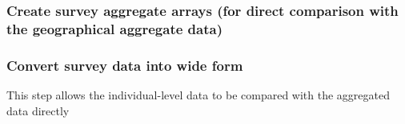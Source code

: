 \subsubsection{Create survey aggregate arrays (for direct comparison
with the geographical aggregate data)}

\begin{Shaded}
\begin{Highlighting}[]
\NormalTok{(} \NormalTok{(}
\NormalTok{(} \NormalTok{(}
\NormalTok{(} \NormalTok{(}
\end{Highlighting}
\end{Shaded}
\subsubsection{Convert survey data into wide form}

This step allows the individual-level data to be compared with the
aggregated data directly

